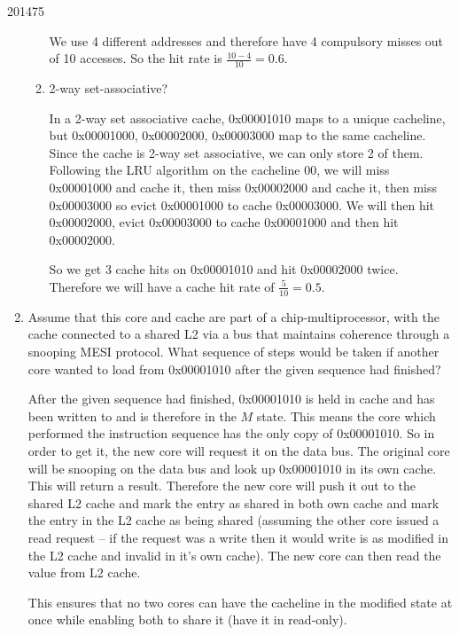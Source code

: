 \documentclass[10pt,\jkfside,a4paper]{article}
\begin{document}
\begin{examquestion}{2014}{7}{5}
\begin{enumerate}[label=(\alph*)]
\begin{enumerate}[label=(\roman*)]
We use 4 different addresses and therefore have 4 compulsory misses out of
10 accesses. So the hit rate is $\frac{10 - 4}{10} = 0.6$.

\item 2-way set-associative?

In a 2-way set associative cache, 0x00001010 maps to a unique cacheline, but
0x00001000, 0x00002000, 0x00003000 map to the same cacheline. Since the
cache is 2-way set associative, we can only store 2 of them. Following the LRU
algorithm on the cacheline 00, we will miss 0x00001000 and cache it,
then miss 0x00002000 and cache it, then miss 0x00003000 so evict 0x00001000
to cache 0x00003000. We will then hit 0x00002000, evict 0x00003000 to cache
0x00001000 and then hit 0x00002000.

So we get 3 cache hits on 0x00001010 and hit 0x00002000 twice. Therefore we
will have a cache hit rate of $\frac{5}{10} = 0.5$.

\end{enumerate}

\setcounter{enumi}{3}

\item Assume that this core and cache are part of a chip-multiprocessor,
with the cache connected to a shared L2 via a bus that maintains coherence
through a snooping MESI protocol. What sequence of steps would be taken if
another core wanted to load from 0x00001010 after the given sequence had
finished?

After the given sequence had finished, 0x00001010 is held in cache and has
been written to and is therefore in the $M$ state. This means the core which
performed the instruction sequence has the only copy of 0x00001010. So in
order to get it, the new core will request it on the data bus. The original
core will be snooping on the data bus and look up 0x00001010 in its own
cache. This will return a result. Therefore the new core will push it out to
the shared L2 cache and mark the entry as shared in both own cache and mark
the entry in the L2 cache as being shared (assuming the other core issued a
read request -- if the request was a write then it would write is as
modified in the L2 cache and invalid in it's own cache). The new core can
then read the value from L2 cache.

This ensures that no two cores can have the cacheline in the modified state
at once while enabling both to share it (have it in read-only).

\end{enumerate}

\end{examquestion}
\end{document}
